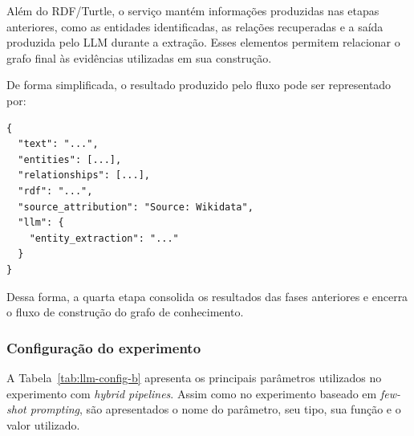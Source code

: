 Além do RDF/Turtle, o serviço mantém informações produzidas nas etapas anteriores, como as entidades identificadas, as relações recuperadas e a saída produzida pelo LLM durante a extração. Esses elementos permitem relacionar o grafo final às evidências utilizadas em sua construção.

De forma simplificada, o resultado produzido pelo fluxo pode ser representado por:

\begin{verbatim}
{
  "text": "...",
  "entities": [...],
  "relationships": [...],
  "rdf": "...",
  "source_attribution": "Source: Wikidata",
  "llm": {
    "entity_extraction": "..."
  }
}
\end{verbatim}

Dessa forma, a quarta etapa consolida os resultados das fases anteriores e encerra o fluxo de construção do grafo de conhecimento.


\subsubsection{Configuração do experimento}

A Tabela~\ref{tab:llm-config-b} apresenta os principais parâmetros utilizados no experimento com \textit{hybrid pipelines}. Assim como no experimento baseado em \textit{few-shot prompting}, são apresentados o nome do parâmetro, seu tipo, sua função e o valor utilizado.

